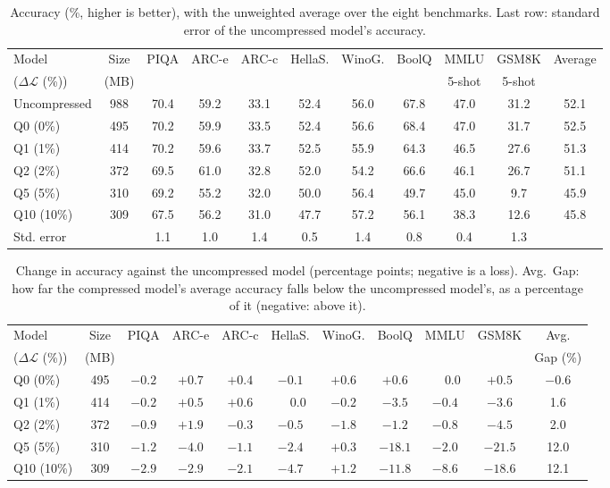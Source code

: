 \documentclass[11pt]{article}
\newcommand{\dloss}{\Delta\mathcal{L}}
\begin{document}
\begin{table}[!ht]
\centering
\small
\setlength{\tabcolsep}{4pt}
\begin{tabular}{lcccccccccc}
\toprule
Model & Size & PIQA & ARC-e & ARC-c & HellaS. & WinoG. & BoolQ & MMLU & GSM8K & Average \\
($\dloss$ (\%)) & (MB) &      &       &       &         &        &       & 5-shot & 5-shot &       \\
\midrule
Uncompressed & 988 & 70.4 & 59.2 & 33.1 & 52.4 & 56.0 & 67.8 & 47.0 & 31.2 & 52.1 \\
\addlinespace
Q0  (0\%)    & 495 & 70.2 & 59.9 & 33.5 & 52.4 & 56.6 & 68.4 & 47.0 & 31.7 & 52.5 \\
Q1  (1\%)    & 414 & 70.2 & 59.6 & 33.7 & 52.5 & 55.9 & 64.3 & 46.5 & 27.6 & 51.3 \\
Q2  (2\%)    & 372 & 69.5 & 61.0 & 32.8 & 52.0 & 54.2 & 66.6 & 46.1 & 26.7 & 51.1 \\
Q5  (5\%)    & 310 & 69.2 & 55.2 & 32.0 & 50.0 & 56.4 & 49.7 & 45.0 &  9.7 & 45.9 \\
Q10 (10\%)   & 309 & 67.5 & 56.2 & 31.0 & 47.7 & 57.2 & 56.1 & 38.3 & 12.6 & 45.8 \\
\midrule
Std. error   &     & 1.1  & 1.0  & 1.4  & 0.5  & 1.4  & 0.8  & 0.4  & 1.3  &      \\
\bottomrule
\end{tabular}
\caption{Accuracy (\%, higher is better), with the unweighted average over the eight benchmarks. Last
row: standard error of the uncompressed model's accuracy.}
\label{tab:results}
\end{table}

\begin{table}[!ht]
\centering
\small
\setlength{\tabcolsep}{4pt}
\begin{tabular}{lcccccccccc}
\toprule
Model & Size & PIQA & ARC-e & ARC-c & HellaS. & WinoG. & BoolQ & MMLU & GSM8K & Avg. \\
($\dloss$ (\%)) & (MB) &      &       &       &         &        &       &      &       & Gap (\%)       \\
\midrule
Q0  (0\%)  & 495 & $-0.2$ & $+0.7$ & $+0.4$ & $-0.1$ & $+0.6$ & $+0.6$  & $\phantom{+}0.0$ & $+0.5$ & $-0.6$ \\
Q1  (1\%)  & 414 & $-0.2$ & $+0.5$ & $+0.6$ & $\phantom{+}0.0$ & $-0.2$ & $-3.5$ & $-0.4$ & $-3.6$ & 1.6 \\
Q2  (2\%)  & 372 & $-0.9$ & $+1.9$ & $-0.3$ & $-0.5$ & $-1.8$ & $-1.2$  & $-0.8$ & $-4.5$  & 2.0 \\
Q5  (5\%)  & 310 & $-1.2$ & $-4.0$ & $-1.1$ & $-2.4$ & $+0.3$ & $-18.1$ & $-2.0$ & $-21.5$ & 12.0 \\
Q10 (10\%) & 309 & $-2.9$ & $-2.9$ & $-2.1$ & $-4.7$ & $+1.2$ & $-11.8$ & $-8.6$ & $-18.6$ & 12.1 \\
\bottomrule
\end{tabular}
\caption{Change in accuracy against the uncompressed model (percentage points; negative is a loss). Avg.\ Gap: how far the compressed model's average accuracy falls below the uncompressed model's, as a percentage of it (negative: above it).}
\label{tab:delta}
\end{table}
\end{document}
